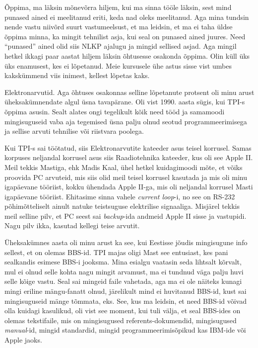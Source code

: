 
Õppima, ma läksin mõnevõrra hiljem, kui ma sinna tööle läksin, sest mind punased ained ei  meelitanud eriti, keda nad oleks meelitanud. Aga mina tundsin nende vastu niivõrd suurt vastumeelsust,  et ma leidsin, et ma ei taha  üldse õppima minna, ka mingit tehnilist asja, kui seal on  punased ained juures. Need \enquote{punased} ained olid siis  NLKP ajalugu ja mingid sellised asjad. Aga mingil hetkel ikkagi paar aastat hiljem läksin õhtusesse osakonda õppima. Olin küll üks  üks enamusest, kes ei lõpetanud. Meie kursusele ühe astus sisse vist umbes kakskümmend viis inimest, kellest lõpetas kaks. 


Elektronarvutid. Aga õhtuses osakonnas selline lõpetanute protsent oli minu arust üheksakümnendate algul üsna tavapärane. Oli vist 1990. aasta sügis, kui TPI-s õppima asusin. Sealt alates ongi tegelikult kõik need tööd ja samamoodi mingisuguseid vaba aja tegemised üsna palju olnud seotud programmeerimisega ja sellise arvuti tehnilise või riistvara poolega.

Kui  TPI-s sai töötatud, siis Elektronarvutite kateeder asus teisel korrusel. Samas korpuses neljandal korrusel asus siis Raadiotehnika kateeder, kus oli see Apple II. Meil tekkis Mastiga, ehk Madis Kaal, ühel hetkel kuidagimoodi mõte, et võiks proovida PC arvuteid, mis siis olid meil teisel korrusel kasutada ja mis oli minu igapäevane tööriist, kokku ühendada  Apple II-ga, mis oli neljandal korrusel Masti igapäevane tööriist. Ehitasime sinna vahele \emph{current loop}-i, no see on RS-232 põhimõtteliselt ainult natuke teistsuguse elektrilise signaaliga. Misjärel tekkis meil  selline pilv, et PC seest sai \emph{backup}-ida  andmeid Apple II sisse ja vastupidi. Nagu pilv ikka, kasutad kellegi teise arvutit. 

Üheksakümnes aasta oli minu arust ka see, kui Eestisse jõudis mingisugune info sellest, et on olemas BBS-id. TPI majas oligi Mast  see entusiast, kes pani sealkandis esimese BBS-i jooksma. Mina esialgu vaatasin seda lihtsalt kõrvalt, mul ei olnud selle kohta nagu mingit arvamust,  ma ei tundnud  väga palju huvi selle kõige vastu. Seal sai mingeid faile vahetada, aga  ma ei ole näiteks kunagi mingi eriline mängu-fanatt olnud, järelikult mind ei huvitanud BBS-id, kust sai mingisuguseid mänge tõmmata, eks. See, kus ma leidsin, et need BBS-id võivad olla kuidagi kasulikud,  oli vist see moment, kui tuli välja, et seal BBS-ides on olemas  tekstifaile, mis on mingisugused referents-dokumendid, mingisugused \emph{manual}-id, mingid standardid, mingid programmeerimisõpikud kas IBM-ide või Apple jaoks.

